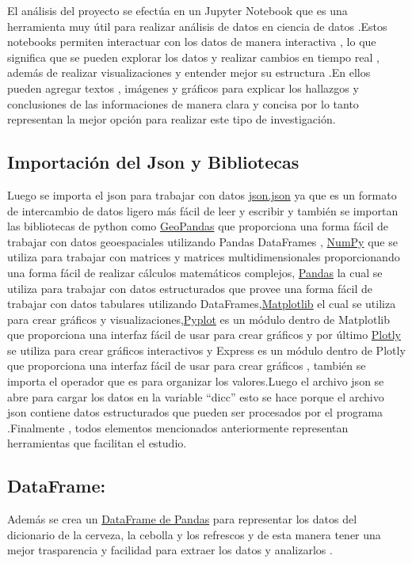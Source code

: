 \documentclass[twocolumn,12pt]{article}
\begin{document}
El análisis del proyecto se efectúa en un Jupyter Notebook que es una herramienta muy útil para realizar análisis de datos en ciencia de datos .Estos  notebooks permiten interactuar con los datos de manera interactiva , lo que significa que se pueden explorar los datos y realizar cambios en tiempo real , además de realizar visualizaciones y entender mejor su estructura .En ellos pueden agregar textos , imágenes y gráficos para explicar los hallazgos y conclusiones de las informaciones de manera clara y concisa por lo tanto representan la mejor opción para realizar este tipo de investigación.

\subsection{Importación del Json y Bibliotecas}

Luego se importa el json para trabajar con datos \underline{json.json} ya que es un formato de intercambio de datos ligero más fácil de leer y escribir y también se importan las bibliotecas de python como \underline{GeoPandas} que  proporciona una forma fácil de trabajar con datos geoespaciales utilizando Pandas DataFrames , \underline{NumPy} que se utiliza para trabajar con matrices y matrices multidimensionales proporcionando una forma fácil de realizar cálculos matemáticos complejos, \underline{Pandas} la cual se utiliza para trabajar con datos estructurados que provee una forma fácil de trabajar con datos tabulares utilizando DataFrames,\underline{Matplotlib} el cual se utiliza para crear gráficos y visualizaciones,\underline{Pyplot} es un módulo dentro de Matplotlib que proporciona una interfaz fácil de usar para crear gráficos y por último \underline{Plotly} se utiliza para crear gráficos interactivos y Express es un módulo dentro de Plotly que proporciona una interfaz fácil de usar para crear gráficos , también se importa el operador que es para organizar los valores.Luego el archivo json se abre para cargar los datos en la variable “dicc” esto  se hace porque el archivo json contiene datos estructurados que pueden ser procesados por el programa .Finalmente , todos elementos mencionados anteriormente  representan herramientas que facilitan el estudio.

\subsection{DataFrame:}

Además  se crea un \underline{DataFrame de Pandas} para representar los datos del dicionario de la cerveza, la cebolla y los refrescos y de esta manera tener una mejor trasparencia y facilidad para extraer los datos  y analizarlos .                                 
\end{document}

